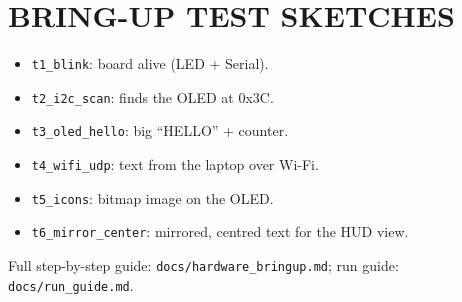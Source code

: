 \documentclass[12pt,a4paper]{report}
\begin{document}
\chapter{BRING-UP TEST SKETCHES}
\begin{itemize}
  \item \texttt{t1\_blink}: board alive (LED + Serial).
  \item \texttt{t2\_i2c\_scan}: finds the OLED at 0x3C.
  \item \texttt{t3\_oled\_hello}: big ``HELLO'' + counter.
  \item \texttt{t4\_wifi\_udp}: text from the laptop over Wi-Fi.
  \item \texttt{t5\_icons}: bitmap image on the OLED.
  \item \texttt{t6\_mirror\_center}: mirrored, centred text for the HUD view.
\end{itemize}
Full step-by-step guide: \texttt{docs/hardware\_bringup.md}; run guide: \texttt{docs/run\_guide.md}.
\end{document}
